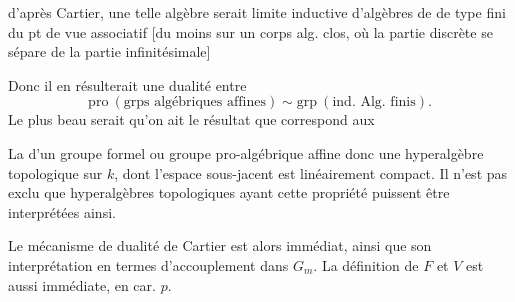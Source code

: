 
d'après Cartier,  une telle algèbre serait limite inductive d'algèbres de  de type fini du pt de vue associatif [du moins sur un corps alg. clos, où la partie discrète se sépare de la partie infinitésimale]

Donc il en résulterait une dualité entre
\[
\mathrm{pro}\ (\text{grps algébriques affines})\sim\mathrm{grp}\ (\text{ind. Alg. finis}).
\]
Le plus beau serait  qu'on ait le résultat que  correspond aux  \uline{}

La  d'un  groupe formel ou groupe pro-algébrique affine   donc une  hyperalgèbre topologique sur $k$, dont l'espace sous-jacent est linéairement compact. Il n'est pas exclu que  hyperalgèbres topologiques ayant cette propriété  puissent être interprétées ainsi. 

Le mécanisme de dualité de Cartier est alors immédiat, ainsi que son interprétation en termes d'accouplement dans $G_m$. La définition de $F$ et $V$ est aussi immédiate, en car. $p$.


